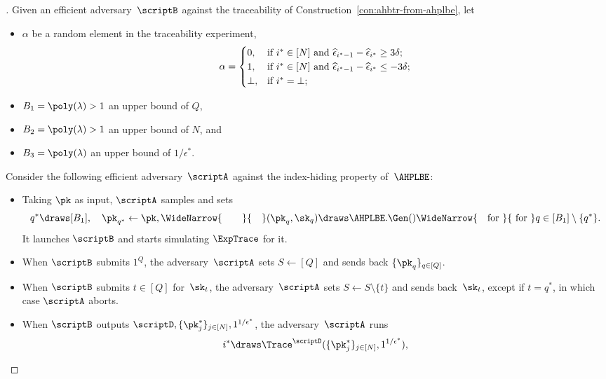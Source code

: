 \begin{proof}[]
Given an efficient adversary~$\scriptB$ against the traceability of Construction~\ref{con:ahbtr-from-ahplbe},
let
\begin{itemize}
\item $\alpha$ be a random element in the traceability experiment,
\begin{align*}
\alpha=\begin{cases}
0,&\textup{if }i^\ast\in[N]\textup{ and }
\widehat{\epsilon}_{i^\ast-1}-\widehat{\epsilon}_{i^\ast}\geq 3\delta;\\
1,&\textup{if }i^\ast\in[N]\textup{ and }
\widehat{\epsilon}_{i^\ast-1}-\widehat{\epsilon}_{i^\ast}\leq -3\delta;\\
\bot,&\textup{if }i^\ast=\bot;
\end{cases}
\end{align*}
\item $B_1=\poly(\lambda)>1$ an upper bound of $Q$,
\item $B_2=\poly(\lambda)>1$ an upper bound of $N$, and
\item $B_3=\poly(\lambda)$ an upper bound of $1/\epsilon^\ast$.
\end{itemize}
Consider the following efficient adversary~$\scriptA$ against the index-hiding property of~$\AHPLBE$:
\begin{itemize}
\item Taking $\pk$ as input, $\scriptA$ samples and sets
\begin{align*}
q^\ast\draws[B_1],\quad
\pk_{q^\ast}\gets\pk,\WideNarrow{\qquad}{\quad}
(\pk_q,\sk_q)\draws\AHPLBE.\Gen()
\WideNarrow{\quad\textup{for }}{\textup{ for }}q\in[B_1]\setminus\{q^\ast\}.
\end{align*}
It launches $\scriptB$ and starts simulating $\ExpTrace$ for it.
\item When $\scriptB$ submits $1^Q$,
the adversary~$\scriptA$ sets ${S\gets[Q]}$ and sends back $\{\pk_q\}_{q\in[Q]}$.
\item When $\scriptB$ submits ${t\in[Q]}$ for~$\sk_t$,
the adversary~$\scriptA$ sets ${S\gets S\setminus\{t\}}$ and sends back~$\sk_t$,
except if ${t=q^\ast}$, in which case $\scriptA$ aborts.
\item When $\scriptB$ outputs $\scriptD,\{\pk^\ast_j\}_{j\in[N]},1^{1/\epsilon^\ast}$,
the adversary~$\scriptA$ runs
\begin{align*}
i^\ast\draws\Trace^\scriptD(\{\pk^\ast_j\}_{j\in[N]},1^{1/\epsilon^\ast}),

\end{align*}
\end{itemize}
\end{proof}
